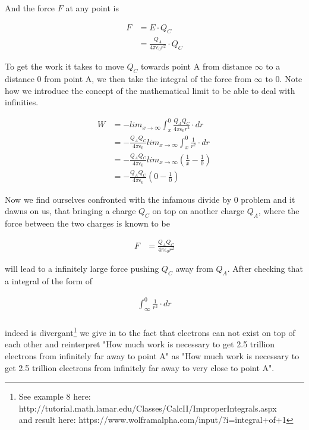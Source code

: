\documentclass[paper=a4, fontsize=11pt]{scrartcl} %
\numberwithin{equation}{section} %
\numberwithin{figure}{section} %
\numberwithin{table}{section} %
\begin{document}
And the force $F$ at any point is

\begin{align} \label{eq:4}
F &= E \cdot Q_C \\
  &= \frac{Q_A}{4 \pi \epsilon_0 r^2} \cdot Q_C
\end{align}

To get the work it takes to move $Q_C$ towards point A from distance $\infty$ to a distance 0 from point A,
we then take the integral of the force from $\infty$ to 0. Note how we introduce the concept of the mathematical limit
to be able to deal with infinities.

\begin{align} \label{eq:5}
W &= - lim_{x\to\infty} \int_x^0{\frac{Q_A Q_C}{4 \pi \epsilon_0 r^2}} \cdot dr \\
  &= - \frac{Q_A Q_C}{4 \pi \epsilon_0 } lim_{x\to\infty} \int_x^0{\frac{1}{r^2}} \cdot dr \\
  &= - \frac{Q_A Q_C}{4 \pi \epsilon_0 } lim_{x\to\infty} \left( \frac{1}{x} - \frac{1}{0} \right) \\
  &= - \frac{Q_A Q_C}{4 \pi \epsilon_0 } \left( 0 - \frac{1}{0} \right)
\end{align}

Now we find ourselves confronted with the infamous divide by 0 problem and it dawns on us, that bringing a charge
$Q_C$ on top on another charge $Q_A$, where the force between the two charges is known to be

\begin{align} \label{eq:6}
F &= \frac{Q_A  Q_C}{4 \pi \epsilon_0 r^2}
\end{align}

will lead to a infinitely large force pushing $Q_C$ away from $Q_A$. After checking that a integral of the form of

\begin{align} \label{eq:7}
\int_\infty^0{\frac{1}{r^2}} \cdot dr \\
\end{align}

indeed is divergant\footnote{ See example 8 here: http://tutorial.math.lamar.edu/Classes/CalcII/ImproperIntegrals.aspx \\ and result here: https://www.wolframalpha.com/input/?i=integral+of+1%
} we give in to the fact that electrons can not exist on top of each other and reinterpret "How much work is necessary to get
2.5 trillion electrons from infinitely far away to point A" as "How much work is necessary to get
2.5 trillion electrons from infinitely far away to very close to point A".
\end{document}
